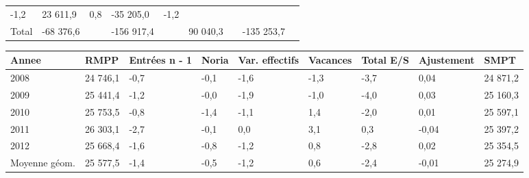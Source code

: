 \begin{longtable}[]{@{}lllllllll@{}}
\begin{minipage}[t]{0.06\columnwidth}
-1,2\strut
\end{minipage} & \begin{minipage}[t]{0.12\columnwidth}\raggedright
23 611,9\strut
\end{minipage} & \begin{minipage}[t]{0.06\columnwidth}\raggedright
0,8\strut
\end{minipage} & \begin{minipage}[t]{0.09\columnwidth}\raggedright
-35 205,0\strut
\end{minipage} & \begin{minipage}[t]{0.06\columnwidth}\raggedright
-1,2\strut
\end{minipage}\tabularnewline
\begin{minipage}[t]{0.05\columnwidth}\raggedright
Total\strut
\end{minipage} & \begin{minipage}[t]{0.10\columnwidth}\raggedright
-68 376,6\strut
\end{minipage} & \begin{minipage}[t]{0.06\columnwidth}\raggedright
\strut
\end{minipage} & \begin{minipage}[t]{0.16\columnwidth}\raggedright
-156 917,4\strut
\end{minipage} & \begin{minipage}[t]{0.06\columnwidth}\raggedright
\strut
\end{minipage} & \begin{minipage}[t]{0.12\columnwidth}\raggedright
90 040,3\strut
\end{minipage} & \begin{minipage}[t]{0.06\columnwidth}\raggedright
\strut
\end{minipage} & \begin{minipage}[t]{0.09\columnwidth}\raggedright
-135 253,7\strut
\end{minipage} & \begin{minipage}[t]{0.06\columnwidth}\raggedright
\strut
\end{minipage}\tabularnewline
\bottomrule
\end{longtable}

\begin{longtable}[]{@{}lllllllll@{}}
\toprule
Annee & RMPP & Entrées n - 1 & Noria & Var. effectifs & Vacances & Total
E/S & Ajustement & SMPT\tabularnewline
\midrule
\endhead
2008 & 24 746,1 & -0,7 & -0,1 & -1,6 & -1,3 & -3,7 & 0,04 & 24
871,2\tabularnewline
2009 & 25 441,4 & -1,2 & -0,0 & -1,9 & -1,0 & -4,0 & 0,03 & 25
160,3\tabularnewline
2010 & 25 753,5 & -0,8 & -1,4 & -1,1 & 1,4 & -2,0 & 0,01 & 25
597,1\tabularnewline
2011 & 26 303,1 & -2,7 & -0,1 & 0,0 & 3,1 & 0,3 & -0,04 & 25
397,2\tabularnewline
2012 & 25 668,4 & -1,6 & -0,8 & -1,2 & 0,8 & -2,8 & 0,02 & 25
354,5\tabularnewline
Moyenne géom. & 25 577,5 & -1,4 & -0,5 & -1,2 & 0,6 & -2,4 & -0,01 & 25
274,9\tabularnewline
\bottomrule
\end{longtable}

